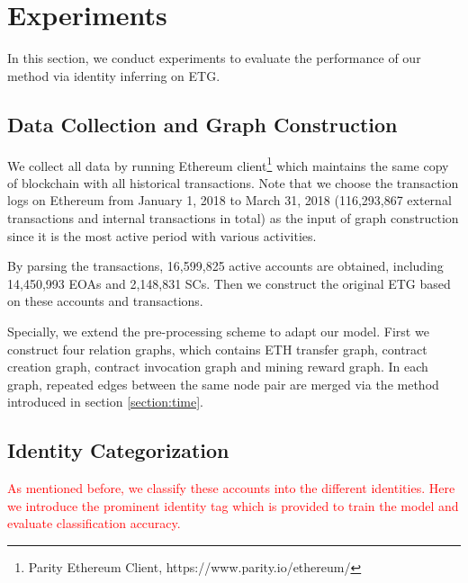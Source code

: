 
\section{Experiments}
In this section, we conduct experiments to evaluate the performance of our method via identity inferring on ETG.

\subsection{Data Collection and Graph Construction}
We collect all data by running Ethereum client\footnote{Parity Ethereum Client, https://www.parity.io/ethereum/} which maintains the same copy of blockchain with all historical transactions. Note that we choose the transaction logs on Ethereum from January 1, 2018 to March 31, 2018 (116,293,867 external transactions and internal transactions in total) as the input of graph construction since it is the most active period with various activities.

By parsing the transactions, 16,599,825 active accounts are obtained, including 14,450,993 EOAs and 2,148,831 SCs. Then we construct the original ETG based on these accounts and transactions.

Specially, we extend the pre-processing scheme to adapt our model. First we construct four relation graphs, which contains ETH transfer graph, contract creation graph, contract invocation graph and mining reward graph. In each graph, repeated edges between the same node pair are merged via the method introduced in section \ref{section:time}.


\subsection{Identity Categorization}
\textcolor{red}{As mentioned before, we classify these accounts into the different identities. Here we introduce the prominent identity tag which is provided to train the model and evaluate classification accuracy.}

